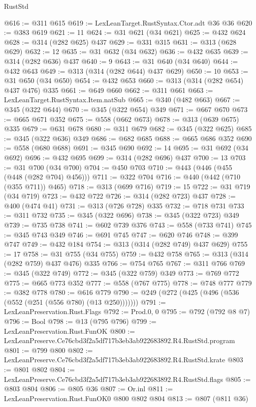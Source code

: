 \begin{lexlean}{RustStd}
\begin{coremodule}
@616 := @311 @615
@619 := LexLeanTarget.RustSyntax.Ctor.adt @36 @36
@620 := @383 @619
@621 := 11
@624 := @31 @621 (@34 @621)
@625 := @432 @624
@628 := @314 (@282 @625) @437
@629 := @331 @315
@631 := @313 (@628 @629)
@632 := 12
@635 := @31 @632 (@34 @632)
@636 := @432 @635
@639 := @314 (@282 @636) @437
@640 := 9
@643 := @31 @640 (@34 @640)
@644 := @432 @643
@649 := @313 (@314 (@282 @644) @437 @629)
@650 := 10
@653 := @31 @650 (@34 @650)
@654 := @432 @653
@660 := @313 (@314 (@282 @654) @437 @476) @335
@661 := @649 @660
@662 := @311 @661
@663 := LexLeanTarget.RustSyntax.Item.natSub
@665 := @340 (@482 @663)
@667 := @345 (@322 @644)
@670 := @345 (@322 @654) @349
@671 := @667 @670
@673 := @665 @671 @352
@675 := @558 (@662 @673)
@678 := @313 (@639 @675) @335
@679 := @631 @678
@680 := @311 @679
@682 := @345 (@322 @625)
@685 := @345 (@322 @636) @349
@686 := @682 @685
@688 := @665 @686 @352
@690 := @558 (@680 @688)
@691 := @345 @690
@692 := 14
@695 := @31 @692 (@34 @692)
@696 := @432 @695
@699 := @314 (@282 @696) @437
@700 := 13
@703 := @31 @700 (@34 @700)
@704 := @450 @703
@710 := @443 (@446 (@455 (@448 (@282 @704) @456)))
@711 := @322 @704
@716 := @440 (@442 (@710 (@355 @711)) @465)
@718 := @313 (@699 @716)
@719 := 15
@722 := @31 @719 (@34 @719)
@723 := @432 @722
@726 := @314 (@282 @723) @437
@728 := @400 (@474 @41)
@731 := @313 (@726 @728) @335
@732 := @718 @731
@733 := @311 @732
@735 := @345 (@322 @696)
@738 := @345 (@322 @723) @349
@739 := @735 @738
@741 := @602 @739 @376
@743 := @558 (@733 @741)
@745 := @345 @743 @349
@746 := @691 @745
@747 := @620 @746
@748 := @399 @747
@749 := @432 @184
@754 := @313 (@314 (@282 @749) @437 @629)
@755 := 17
@758 := @31 @755 (@34 @755)
@759 := @432 @758
@765 := @313 (@314 (@282 @759) @437 @476) @335
@766 := @754 @765
@767 := @311 @766
@769 := @345 (@322 @749)
@772 := @345 (@322 @759) @349
@773 := @769 @772
@775 := @665 @773 @352
@777 := @558 (@767 @775)
@778 := @748 @777
@779 := @382 @778
@780 := @616 @779
@790 := @249 (@272 (@425 (@496 (@536 (@552 (@251 (@556 @780) (@13 @250)))))))
@791 := LexLeanPreservation.Rust.Flags
@792 := Prod.{0, 0}
@795 := @792 (@792 @8 @7)
@796 := Bool
@798 := @13 (@795 @796)
@799 := LexLeanPreservation.Rust.FunOK
@800 := LexLeanPreserve.Ce76cbd3f2a5df717b3eb3ab922683892.R4.RustStd.program
@801 := @799 @800
@802 := LexLeanPreserve.Ce76cbd3f2a5df717b3eb3ab922683892.R4.RustStd.krate
@803 := @801 @802
@804 := LexLeanPreserve.Ce76cbd3f2a5df717b3eb3ab922683892.R4.RustStd.flags
@805 := @803 @804
@806 := @805 @36
@807 := Or.inl
@811 := LexLeanPreservation.Rust.FunOK0 @800 @802 @804
@813 := @807 (@811 @36)

\end{coremodule}
\end{lexlean}
